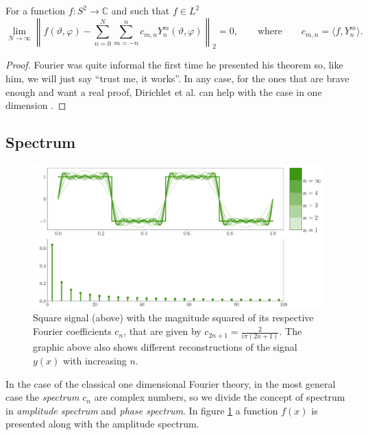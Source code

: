 \begin{theorem}
  \label{kugel:thm:fourier-s2}
  For a function $f: S^2 \to \mathbb{C}$ and such that $f \in L^2$
  \begin{equation*}
    \lim_{N \to \infty}
    \left\|
      f(\vartheta,\varphi)
      - \sum_{n=0}^N\sum_{m=-n}^n c_{m,n} Y^m_n(\vartheta,\varphi)
    \right\|_2 = 0,
    \qquad\text{where}\qquad
    c_{m,n} = \langle f, Y^m_n \rangle.
  \end{equation*}
\end{theorem}
\begin{proof}
  Fourier was quite informal the first time he presented his theorem so, like
  him, we will just say ``trust me, it works''. In any case, for the ones that
  are brave enough and want a real proof, Dirichlet et al. can help with the
  case in one dimension \cite{convergence_fourier}.
\end{proof}

\subsection{Spectrum}

\begin{figure}
  \centering
  \includegraphics[width=.95\textwidth]{papers/kugel/figures/python/1D-fourier.pdf}
  \caption{
    Square signal (above) with the magnitude squared of its respective Fourier
    coefficients $c_n$, that are given by $c_{2n+1}=\frac{2}{i\pi(2n+1)}$. The
    graphic above also shows different reconstructions of the signal $y(x)$ with
    increasing $n$.
    \label{kugel:fig:1d-fourier}
  }
\end{figure}


 In the case of the classical one dimensional Fourier theory, in the most
 general case the \emph{spectrum} $c_n$ are complex numbers, so we divide the
 concept of spectrum in \emph{amplitude spectrum} and \emph{phase spectrum}. In
 figure \ref{kugel:fig:1d-fourier} a function $f(x)$ is presented along with the
 amplitude spectrum.

